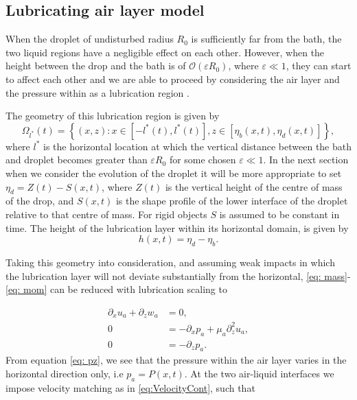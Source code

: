\subsection{Lubricating air layer model}

When the droplet of undisturbed radius $R_0$ is sufficiently far from the bath, the two liquid regions have a negligible effect on each other. However, when the height between the drop and the bath is of $\mathcal{O}(\varepsilon R_0)$, where $\varepsilon \ll 1$, they can start to affect each other and we are able to proceed by considering the air layer and the pressure within as a lubrication region \cite{hicks2013liquid}. 

The geometry of this lubrication region is given by
\begin{equation*}
\Omega_{l^*}(t) = \left\{(x,z): x \in [-l^*(t),l^*(t)], z \in [\eta_b(x,t),\eta_d(x,t)] \right\},    
\end{equation*}
where $l^*$ is the horizontal location at which the vertical distance between the bath and droplet becomes greater than $\varepsilon R_0$ for some chosen $\varepsilon \ll 1$. In the next section when we consider the evolution of the droplet it will be more appropriate to set $\eta_d = Z(t)-S(x,t)$, where $Z(t)$ is the vertical height of the centre of mass of the drop, and $S(x,t)$ is the shape profile of the lower interface of the droplet relative to that centre of mass. For rigid objects $S$ is assumed to be constant in time. The height of the lubrication layer within its horizontal domain, is given by 
\begin{equation}
    h(x,t) = \eta_d - \eta_b.
\end{equation}

Taking this geometry into consideration, and assuming weak impacts in which the lubrication layer will not deviate substantially from the horizontal, \eqref{eq: mass}-\eqref{eq: mom} can be reduced  with lubrication scaling to

\begin{align}
    \partial_x u_a + \partial_z w_a &= 0\label{eq: air mass}, \\
     0 &= -\partial_x p_a + \mu_a \partial_z^2 u_a,\label{eq: uzz} \\
    0 &= -\partial_z p_a. \label{eq: pz}
\end{align}
From equation \eqref{eq: pz}, we see that the pressure within the air layer varies in the horizontal direction only, i.e $p_a = P(x,t)$. At the two air-liquid interfaces we impose velocity matching as in \eqref{eq:VelocityCont}, such that

